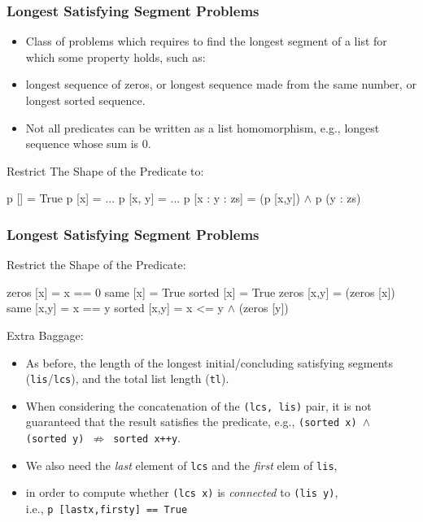 \documentclass{beamer}
\newcommand{\emp}[1]{\textcolor{DikuRed}{ #1}}
\newcommand{\mymath}[1]{$ #1 $}
\begin{document}
\begin{frame}[fragile,t]
  \frametitle{Longest Satisfying Segment Problems}

\begin{itemize}
    \item Class of problems which requires to find the longest segment of a list
            for which some property holds, such as:
    \item longest sequence of zeros, or longest sequence made from the same number, or longest sorted sequence.  
    \item Not all predicates can be written as a list homomorphism, e.g., longest sequence whose sum is 0.
\end{itemize}

\bigskip

\begin{block}{Restrict The Shape of the Predicate to:}
\begin{colorcode}
p []           = True
p [x]          = ...
p [x, y]       = ...
p [x : y : zs] = (p [x,y]) \mymath{\wedge} p (y : zs)
\end{colorcode}
\end{block} 

\end{frame}


\begin{frame}[fragile,t]
  \frametitle{Longest Satisfying Segment Problems}

\begin{block}{Restrict the Shape of the Predicate:}
\begin{colorcode}
zeros [x]   = x == 0           same [x]   = True     sorted [x]   = True
zeros [x,y] =  (zeros [x])     same [x,y] = x == y   sorted [x,y] = x <= y
             \mymath{\wedge} (zeros [y])
\end{colorcode}
\end{block} 

\bigskip
Extra Baggage:
\begin{itemize}
    \item As before, the \emp{length} of the longest initial/concluding  satisfying segments ({\tt lis}/{\tt lcs}),
            and the total list length ({\tt tl}).
    \item When considering the concatenation of the {\tt (lcs, lis)} pair, it is not guaranteed that the
            result satisfies the predicate, e.g., 
            {\tt (sorted x) $\wedge$ (sorted y) $\not\Rightarrow$ sorted x++y}. \pause  
    \item We also need the {\em last} element of {\tt lcs} and the {\em first} elem of {\tt lis},
    \item in order to compute whether {\tt (lcs x)} is {\em connected} to {\tt (lis y)}, \\ i.e., {\tt p [lastx,firsty] == True}
\end{itemize}
\end{frame}
\end{document}
